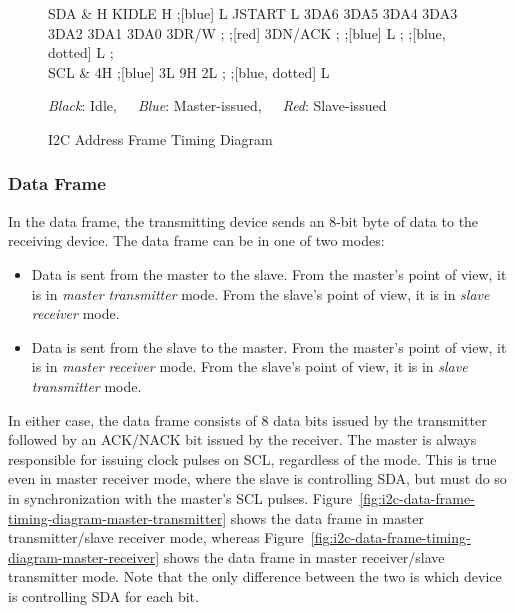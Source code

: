\begin{figure}[h]
	\centering
	\begin{tikztimingtable}[timing/font=\rmfamily, timing/d/text/.append style={font=\rmfamily}, xscale=1.5, yscale=2, timing/slope=0.2, timing/dslope=0.2, timing/d/background/.style={fill=white},
		timing/metachar={{K}[2]{#1H !{++(-.5\xunit + 0.5*\slope\xunit, -.5\yunit)} N[rectangle,scale=.6]{#2} !{++(.5\xunit - 0.5*\slope\xunit, +.5\yunit)}}},
		timing/metachar={{J}[2]{#1L !{++(-.5\xunit + 0.5*\slope\xunit, +.5\yunit)} N[rectangle,scale=.6]{#2} !{++(.5\xunit - 0.5*\slope\xunit, -.5\yunit)}}},]
		SDA & H K{IDLE} H ;[blue] L J{START} L 3D{A6} 3D{A5} 3D{A4} 3D{A3} 3D{A2} 3D{A1} 3D{A0} 3D{R/W} ; ;[red] 3D{N/ACK} ; ;[blue] L ; ;[blue, dotted] L ; \\ %
		SCL & 4H ;[blue] 3L 9{H 2L} ; ;[blue, dotted] L \\ %
		\begin{extracode}
		\end{extracode}
	\end{tikztimingtable}
	\textit{Black}: Idle,~~~{\color{blue}\textit{Blue}: Master-issued},~~~{\color{red}\textit{Red}: Slave-issued}
	\caption{I2C Address Frame Timing Diagram}
	\label{fig:i2c-address-frame-timing-diagram}
\end{figure}

\subsubsection{Data Frame}

In the data frame, the transmitting device sends an 8-bit byte of data to the receiving device. The data frame can be in one of two modes:
\begin{itemize}
	\item Data is sent from the master to the slave. From the master's point of view, it is in \textit{master transmitter} mode. From the slave's point of view, it is in \textit{slave receiver} mode.
	\item Data is sent from the slave to the master. From the master's point of view, it is in \textit{master receiver} mode. From the slave's point of view, it is in \textit{slave transmitter} mode.
\end{itemize}

In either case, the data frame consists of 8 data bits issued by the transmitter followed by an ACK/NACK bit issued by the receiver. The master is always responsible for issuing clock pulses on SCL, regardless of the mode. This is true even in master receiver mode, where the slave is controlling SDA, but must do so in synchronization with the master's SCL pulses. Figure~\ref{fig:i2c-data-frame-timing-diagram-master-transmitter} shows the data frame in master transmitter/slave receiver mode, whereas Figure~\ref{fig:i2c-data-frame-timing-diagram-master-receiver} shows the data frame in master receiver/slave transmitter mode. Note that the only difference between the two is which device is controlling SDA for each bit.

